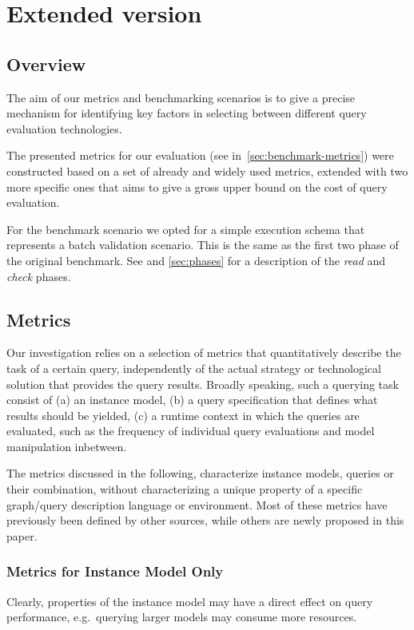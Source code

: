 \section{Extended version}
\label{specification-extended}


\subsection{Overview}
\label{sec:benchmark_overview}
The aim of our metrics and benchmarking scenarios is to give a precise mechanism for identifying key factors in selecting between different query evaluation technologies.

The presented metrics for our evaluation (see in~\autoref{sec:benchmark-metrics}) were constructed based on a set of already and widely used metrics, extended with two more specific ones that aims to give a gross upper bound on the cost of query evaluation.

For the benchmark scenario we opted for a simple execution schema that represents a batch validation scenario. This is the same as the first two phase of the original benchmark. See  and \autoref{sec:phases} for a description of the \emph{read} and \emph{check} phases. 


\subsection{Metrics}
\label{sec:benchmark-metrics}

Our investigation relies on a selection of metrics that quantitatively describe
the task of a certain query, independently of the actual strategy or technological solution
that provides the query results. Broadly speaking, such a querying task consist
of (a) an instance model, (b) a query specification that defines what results
should be yielded, (c) a runtime context in which the queries are evaluated,
such as the frequency of individual query evaluations and model manipulation
inbetween.

The metrics discussed in the following, characterize instance models, queries or their combination, without characterizing a unique property of a specific graph/query description language or environment. Most of these metrics have previously been defined by other sources, while others are newly proposed in this paper.

\subsubsection{Metrics for Instance Model Only}
Clearly, properties of the instance model may have a direct effect on query
performance, e.g.\ querying larger models may consume  more resources.

